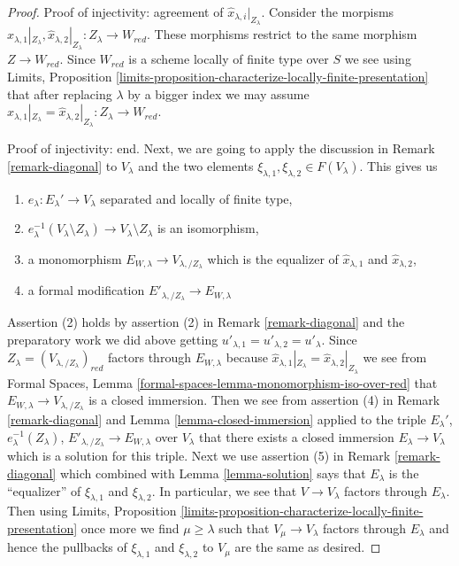\documentclass{stacks-project}
\theoremstyle{plain}
\theoremstyle{definition}
\theoremstyle{remark}
\numberwithin{equation}{subsection}
\begin{document}
\begin{proof}
\medskip\noindent
Proof of injectivity: agreement of $\hat x_{\lambda, i}|_{Z_\lambda}$.
Consider the morpisms
$\hat x_{\lambda, 1}|_{Z_\lambda}, \hat x_{\lambda, 2}|_{Z_\lambda} :
Z_\lambda \to W_{red}$.
These morphisms restrict to the same morphism $Z \to W_{red}$.
Since $W_{red}$ is a scheme locally of finite type over $S$
we see using Limits, Proposition
\ref{limits-proposition-characterize-locally-finite-presentation}
that after replacing $\lambda$ by a bigger index
we may assume
$\hat x_{\lambda, 1}|_{Z_\lambda} = \hat x_{\lambda, 2}|_{Z_\lambda} :
Z_\lambda \to W_{red}$.

\medskip\noindent
Proof of injectivity: end.
Next, we are going to apply the discussion in
Remark \ref{remark-diagonal} to $V_\lambda$ and the two elements
$\xi_{\lambda, 1}, \xi_{\lambda, 2} \in F(V_\lambda)$.
This gives us
\begin{enumerate}
\item $e_\lambda : E_\lambda' \to V_\lambda$
separated and locally of finite type,
\item $e_\lambda^{-1}(V_\lambda \setminus Z_\lambda) \to
V_\lambda \setminus Z_\lambda$ is an isomorphism,
\item a monomorphism $E_{W, \lambda} \to V_{\lambda, /Z_\lambda}$
which is the equalizer of $\hat x_{\lambda, 1}$ and $\hat x_{\lambda, 2}$,
\item a formal modification $E'_{\lambda, /Z_\lambda} \to E_{W, \lambda}$
\end{enumerate}
Assertion (2) holds by assertion (2) in Remark \ref{remark-diagonal}
and the preparatory work we did above getting
$u'_{\lambda, 1} = u'_{\lambda, 2} = u'_\lambda$.
Since $Z_\lambda = (V_{\lambda, /Z_\lambda})_{red}$ factors through
$E_{W, \lambda}$ because
$\hat x_{\lambda, 1}|_{Z_\lambda} = \hat x_{\lambda, 2}|_{Z_\lambda}$
we see from
Formal Spaces, Lemma \ref{formal-spaces-lemma-monomorphism-iso-over-red}
that $E_{W, \lambda} \to V_{\lambda, /Z_\lambda}$ is a closed immersion.
Then we see from assertion (4) in Remark \ref{remark-diagonal}
and Lemma \ref{lemma-closed-immersion} applied to the triple
$E_\lambda'$, $e_\lambda^{-1}(Z_\lambda)$,
$E'_{\lambda, /Z_\lambda} \to E_{W, \lambda}$ over $V_\lambda$ that
there exists a closed immersion $E_\lambda \to V_\lambda$
which is a solution for this triple.
Next we use assertion (5) in Remark \ref{remark-diagonal}
which combined with Lemma \ref{lemma-solution}
says that $E_\lambda$ is the ``equalizer'' of $\xi_{\lambda, 1}$
and $\xi_{\lambda, 2}$. In particular, we see that $V \to V_\lambda$
factors through $E_\lambda$. Then using Limits, Proposition
\ref{limits-proposition-characterize-locally-finite-presentation}
once more we find $\mu \geq \lambda$ such that $V_\mu \to V_\lambda$
factors through $E_\lambda$ and hence the pullbacks of
$\xi_{\lambda, 1}$ and $\xi_{\lambda, 2}$ to $V_\mu$ are the same
as desired.


\end{proof}
\end{document}
